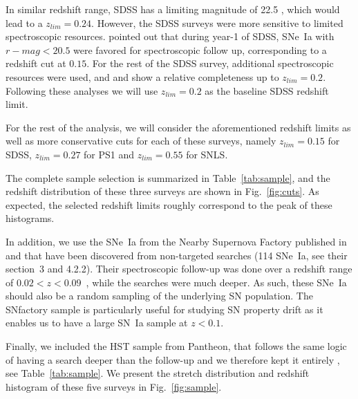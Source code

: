 \documentclass[]{aa} %
\begin{document}
In similar redshift range, SDSS has a limiting magnitude of 22.5
\citep{dilday2008,sako2008}, which would lead to a $z_{lim}=0.24$. However, the
SDSS surveys were more sensitive to limited spectroscopic resources.
\cite{kessler2009} pointed out that during year-1 of SDSS, SNe~Ia with
$r-mag<20.5$ were favored for spectroscopic follow up, corresponding to a
redshift cut at $0.15$. For the rest of the SDSS survey, additional
spectroscopic resources were used, and \cite{kessler2009} and \cite{dilday2008}
show a relative completeness up to $z_{lim}=0.2$. Following these analyses we
will use $z_{lim}=0.2$ as the baseline SDSS redshift limit.

For the rest of the analysis, we will consider the aforementioned redshift
limits as well as more conservative cuts for each of these surveys, namely
$z_{lim}=0.15$ for SDSS, $z_{lim}=0.27$ for PS1 and $z_{lim}=0.55$ for SNLS.

The complete sample selection is summarized in Table~\ref{tab:sample}, and the
redshift distribution of these three surveys are shown in Fig.~\ref{fig:cuts}.
As expected, the selected redshift limits roughly correspond to the peak of
these histograms. 

In addition, we use the SNe~Ia from the Nearby Supernova Factory
\citep[SNfactory,][]{aldering2002} published in \cite{rigault2018} and that have
been discovered from non-targeted searches (114 SNe~Ia, see their section~3 and
4.2.2). Their spectroscopic follow-up was done over a redshift range of
$0.02<z<0.09$~\citep[as in ][]{rigault2018}, while the searches were much
deeper. As such, these SNe~Ia should also be a random sampling of the underlying
SN population. The SNfactory sample is particularly useful for studying SN property
drift as it enables us to have a large SN~Ia sample at $z<0.1$.  

Finally, we included the HST sample from Pantheon, that follows the same logic
of having a search deeper than the follow-up and we therefore kept it entirely
\citep{strolger04}, see Table~\ref{tab:sample}. We present the stretch
distribution and redshift histogram of these five surveys in
Fig.~\ref{fig:sample}.
\end{document}
